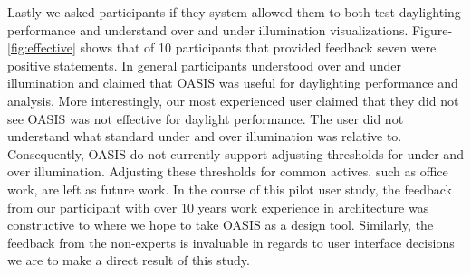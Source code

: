 Lastly we asked participants if they system allowed them to both test daylighting performance and understand over and under illumination visualizations.
Figure-\ref{fig:effective} shows that of 10 participants that provided feedback seven were positive statements.
In general participants understood over and under illumination and claimed that OASIS was useful for daylighting performance and analysis.
More interestingly, our most experienced user claimed that they did not see OASIS was not effective for daylight performance.
The user did not understand what standard under and over illumination was relative to.
Consequently, OASIS do not currently support adjusting thresholds for under and over illumination.
Adjusting these thresholds for common actives, such as office work, are left as future work.
In the course of this pilot user study, the feedback from our participant with over 10 years work experience in architecture was constructive to where we hope to take OASIS as a design tool.
Similarly, the feedback from the non-experts is invaluable in regards to user interface decisions we are to make a direct result of this study.





































